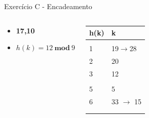 \documentclass{beamer}
\begin{document}
\begin{frame}{Exercício C - Encadeamento}
\begin{columns}
        \footnotesize         
        \begin{block}{}
 		 \begin{itemize}
 		  \item \textbf{17,10}
 		  \item $h(k) = 12 \ \mathbf{mod} \ 9$  
 		 \end{itemize}

 		  \end{block} 
    
        \begin{table}[]
        \centering
        \footnotesize
        \begin{tabular}{|l|l|}
        \hline
        h(k) & k \\ \hline
            &   \\ \hline
        1   & 19$\rightarrow$28  \\ \hline
        2   & 20  \\ \hline
        3   & 12   \\ \hline
            &    \\ \hline
        5   & 5   \\ \hline
        6   & 33 $\rightarrow$ 15   \\ \hline
            &   \\ \hline
            &   \\ \hline
        \end{tabular}%

        \end{table}       
        \end{columns}
\end{frame}
\end{document}
